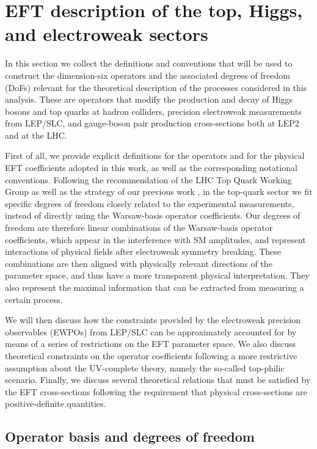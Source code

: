 \section{EFT description of the top, Higgs, and electroweak sectors}
\label{sec:smefttheory}

In this section we collect the definitions and conventions that will
be used to construct the dimension-six operators and the associated degrees of freedom (DoFs)
relevant for the theoretical description of the processes considered
in this analysis.
%
These are operators that modify the production and decay of Higgs bosons
and top quarks at hadron colliders, precision electroweak measurements from LEP/SLC,
and gauge-boson pair production cross-sections both at LEP2 and at the LHC.

First of all,
we provide explicit definitions for the operators
and for the physical EFT coefficients adopted in this work,
as well as the corresponding notational conventions.
%
Following the recommendation of the LHC Top Quark Working Group
\cite{AguilarSaavedra:2018nen} as well as the strategy of our previous work
\cite{Hartland:2019bjb}, in the top-quark sector we fit specific degrees
of freedom closely related to the experimental measurements, instead of directly using the
Warsaw-basis operator coefficients.
%
Our degrees of freedom are therefore linear combinations of the
Warsaw-basis operator coefficients, which appear in the interference with SM
amplitudes, and represent interactions of physical fields after 
electroweak symmetry breaking.
%
These combinations are then aligned with
physically relevant directions of the parameter space, and thus have
a more transparent physical interpretation. They also represent the
maximal information that can be extracted from measuring a certain process.

We will then discuss how the constraints provided by the electroweak precision
observables (EWPOs) from LEP/SLC can be approximately accounted for by means of a series of
restrictions on the EFT parameter space.
%
We also discuss theoretical constraints on the operator coefficients following
a more restrictive assumption about the UV-complete theory, namely the
so-called top-philic scenario.
%
Finally, we discuss several theoretical relations that must be satisfied
by the EFT cross-sections following the requirement that physical cross-sections are positive-definite
quantities.


\subsection{Operator basis and degrees of freedom}
\label{sec:operatorbasis}


